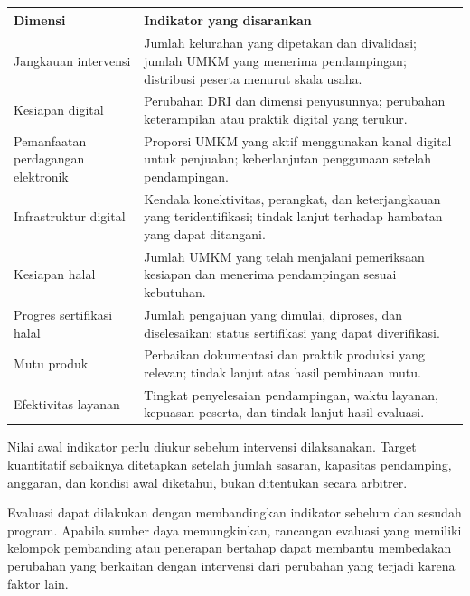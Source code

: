 \documentclass[
  indonesian,
  11pt,
  a4paper,
]{report}
\newcounter{none} %
\begin{document}
{\def\LTcaptype{none} %
\begin{longtable}[]{@{}
  >{\raggedright\arraybackslash}p{}
  >{\raggedright\arraybackslash}p{}@{}}
\toprule\noalign{}
\begin{minipage}[b]{\linewidth}\raggedright
Dimensi
\end{minipage} & \begin{minipage}[b]{\linewidth}\raggedright
Indikator yang disarankan
\end{minipage} \\
\midrule\noalign{}
\endhead
\bottomrule\noalign{}
\endlastfoot
Jangkauan intervensi & Jumlah kelurahan yang dipetakan dan divalidasi;
jumlah UMKM yang menerima pendampingan; distribusi peserta menurut skala
usaha. \\
Kesiapan digital & Perubahan DRI dan dimensi penyusunnya; perubahan
keterampilan atau praktik digital yang terukur. \\
Pemanfaatan perdagangan elektronik & Proporsi UMKM yang aktif
menggunakan kanal digital untuk penjualan; keberlanjutan penggunaan
setelah pendampingan. \\
Infrastruktur digital & Kendala konektivitas, perangkat, dan
keterjangkauan yang teridentifikasi; tindak lanjut terhadap hambatan
yang dapat ditangani. \\
Kesiapan halal & Jumlah UMKM yang telah menjalani pemeriksaan kesiapan
dan menerima pendampingan sesuai kebutuhan. \\
Progres sertifikasi halal & Jumlah pengajuan yang dimulai, diproses, dan
diselesaikan; status sertifikasi yang dapat diverifikasi. \\
Mutu produk & Perbaikan dokumentasi dan praktik produksi yang relevan;
tindak lanjut atas hasil pembinaan mutu. \\
Efektivitas layanan & Tingkat penyelesaian pendampingan, waktu layanan,
kepuasan peserta, dan tindak lanjut hasil evaluasi. \\
\end{longtable}
}

Nilai awal indikator perlu diukur sebelum intervensi dilaksanakan.
Target kuantitatif sebaiknya ditetapkan setelah jumlah sasaran,
kapasitas pendamping, anggaran, dan kondisi awal diketahui, bukan
ditentukan secara arbitrer.

Evaluasi dapat dilakukan dengan membandingkan indikator sebelum dan
sesudah program. Apabila sumber daya memungkinkan, rancangan evaluasi
yang memiliki kelompok pembanding atau penerapan bertahap dapat membantu
membedakan perubahan yang berkaitan dengan intervensi dari perubahan
yang terjadi karena faktor lain.
\end{document}
